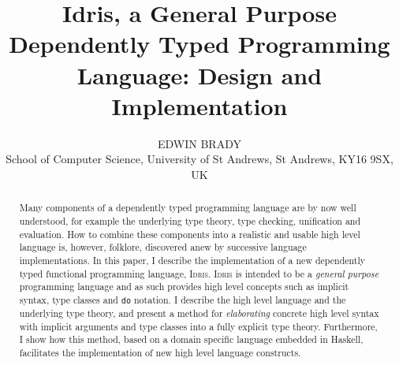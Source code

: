 \documentclass{jfp1}
\title
[Idris, a General Purpose Dependently Typed Programm Language]
{Idris, a General Purpose Dependently Typed Programming Language:
Design and Implementation}
\author[Edwin Brady]
{EDWIN BRADY\\
School of Computer Science, University of St Andrews, St Andrews,
KY16 9SX, UK}
\newcounter{per}
\newcommand{\Idris}{\textsc{Idris}}
\begin{document}
\maketitle

\begin{abstract}
Many components of a dependently typed programming language are by now well
understood, for example the underlying type theory, type checking, unification and
evaluation.  How to combine these components into a realistic and usable high
level language is, however, folklore, discovered anew by successive
language implementations.  In this paper, I describe the implementation of a
new dependently typed functional programming language, \Idris{}.
\Idris{} is intended to be a \emph{general purpose} programming language
and as such provides high level concepts such as implicit syntax, 
type classes and \texttt{do} notation. 
I describe the high level language and the underlying type theory, and present
a method for \emph{elaborating} concrete high level syntax with implicit
arguments and type classes into a fully explicit type theory. Furthermore,
I show how this method,
based on a domain specific language embedded in Haskell, facilitates the
implementation of new high level language constructs.

\end{abstract}







%
\end{document}
